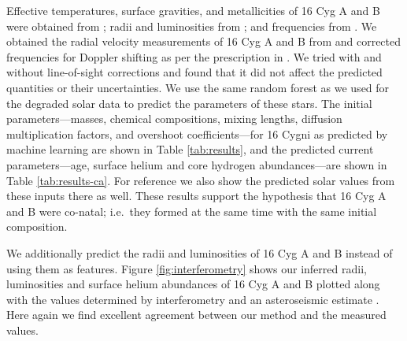 \documentclass[manuscript,linenumbers]{aastex6}
\newif\ifref
\newcommand{\mb}[1]{\ifref\boldmath\textbf{#1}\unboldmath\else #1\fi}
\begin{document}
Effective temperatures, surface gravities, and metallicities of 16 Cyg A and B were obtained from \citet{2009AA...508L..17R}; radii and luminosities from \citet{2013MNRAS.433.1262W}; and frequencies from \citet{2015MNRAS.446.2959D}. We obtained the radial velocity measurements of 16 Cyg A and B from \citet{2002ApJS..141..503N} and corrected frequencies for Doppler shifting as per the prescription in \citet{2014MNRAS.445L..94D}. We tried with and without line-of-sight corrections and found that it did not affect the predicted quantities or their uncertainties. We use the same random forest as we used for the degraded solar data to predict the \mb{parameters} of these stars. The initial parameters---masses, chemical compositions, mixing lengths, diffusion \mb{multiplication} factors, and overshoot coefficients---for 16 Cygni as predicted by machine learning \mb{are shown} in Table \ref{tab:results}, and the predicted current parameters---age, surface helium and core hydrogen abundances---\mb{are shown} in Table \ref{tab:results-ca}. For reference we also show the predicted solar values from these inputs there as well. These results support the hypothesis that 16 Cyg A and B were co-natal; i.e.\ they formed at the same time with the same initial composition. 

We additionally predict the radii and luminosities of 16 Cyg A and B instead of using them as \mb{features}. Figure \ref{fig:interferometry} shows our inferred radii, luminosities and surface helium abundances of 16 Cyg A and B plotted \mb{along with} the values determined by interferometry \citep{2013MNRAS.433.1262W} and an asteroseismic estimate \citep{2014ApJ...790..138V}. Here again we find excellent agreement between our method and the measured values. 
\end{document}
